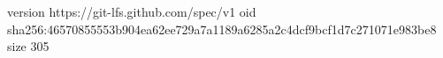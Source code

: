 version https://git-lfs.github.com/spec/v1
oid sha256:46570855553b904ea62ee729a7a1189a6285a2c4dcf9bcf1d7c271071e983be8
size 305
